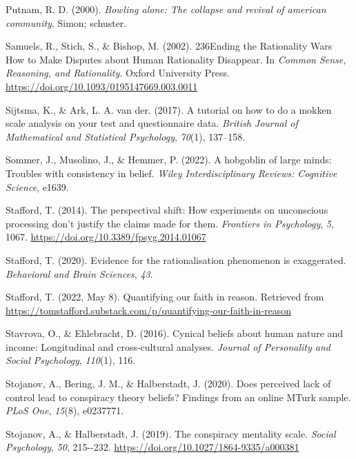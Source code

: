 \documentclass[
  ,jou,floatsintext]{apa6}
\newlength{\cslhangindent}
\newlength{\cslentryspacingunit} %
\newenvironment{CSLReferences}[2] %
 {%
  \setlength{\parindent}{0pt}
  \ifodd #1
  \let\oldpar\par
  \def\par{\hangindent=\cslhangindent\oldpar}
  \fi
  \setlength{\parskip}{#2\cslentryspacingunit}
 }%
 {}
\begin{document}
\begin{CSLReferences}{1}{0}
\leavevmode{}%
Putnam, R. D. (2000). \emph{Bowling alone: The collapse and revival of american community}. Simon; schuster.

\leavevmode{}%
Samuels, R., Stich, S., \& Bishop, M. (2002). {236Ending the Rationality Wars How to Make Disputes about Human Rationality Disappear}. In \emph{{Common Sense, Reasoning, and Rationality}}. Oxford University Press. \url{https://doi.org/10.1093/0195147669.003.0011}

\leavevmode{}%
Sijtsma, K., \& Ark, L. A. van der. (2017). A tutorial on how to do a mokken scale analysis on your test and questionnaire data. \emph{British Journal of Mathematical and Statistical Psychology}, \emph{70}(1), 137--158.

\leavevmode{}%
Sommer, J., Musolino, J., \& Hemmer, P. (2022). A hobgoblin of large minds: Troubles with consistency in belief. \emph{Wiley Interdisciplinary Reviews: Cognitive Science}, e1639.

\leavevmode{}%
Stafford, T. (2014). The perspectival shift: How experiments on unconscious processing don't justify the claims made for them. \emph{Frontiers in Psychology}, \emph{5}, 1067. \url{https://doi.org/10.3389/fpsyg.2014.01067}

\leavevmode{}%
Stafford, T. (2020). Evidence for the rationalisation phenomenon is exaggerated. \emph{Behavioral and Brain Sciences}, \emph{43}.

\leavevmode{}%
Stafford, T. (2022, May 8). Quantifying our faith in reason. Retrieved from \url{https://tomstafford.substack.com/p/quantifying-our-faith-in-reason}

\leavevmode{}%
Stavrova, O., \& Ehlebracht, D. (2016). Cynical beliefs about human nature and income: Longitudinal and cross-cultural analyses. \emph{Journal of Personality and Social Psychology}, \emph{110}(1), 116.

\leavevmode{}%
Stojanov, A., Bering, J. M., \& Halberstadt, J. (2020). Does perceived lack of control lead to conspiracy theory beliefs? Findings from an online MTurk sample. \emph{PLoS One}, \emph{15}(8), e0237771.

\leavevmode{}%
Stojanov, A., \& Halberstadt, J. (2019). The conspiracy mentality scale. \emph{Social Psychology}, \emph{50}, 215-\/-232. \url{https://doi.org/10.1027/1864-9335/a000381}


\end{CSLReferences}
\end{document}
